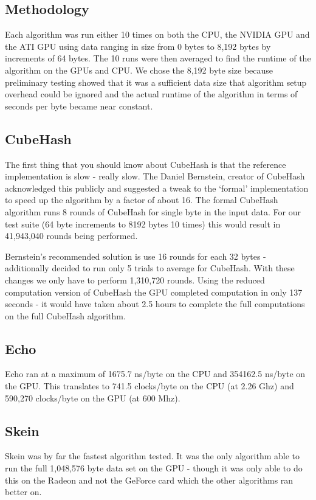 \documentclass{article}
\begin{document}
\subsection*{Methodology}
Each algorithm was run either 10 times on both the CPU, the NVIDIA GPU and the ATI GPU using data ranging in size from 0 bytes to 8,192 bytes by increments of 64 bytes.
The 10 runs were then averaged to find the runtime of the algorithm on the GPUs and CPU.
We chose the 8,192 byte size because preliminary testing showed that it was a sufficient data size that algorithm setup overhead could be ignored and the actual runtime of the algorithm in terms of seconds per byte became near constant.

\subsection*{CubeHash}
The first thing that you should know about CubeHash is that the reference implementation is  slow - really slow.
The Daniel Bernstein, creator of CubeHash acknowledged this publicly\cite{Bernstein} and suggested a tweak to the `formal' implementation to speed up the algorithm by a factor of about 16.
The formal CubeHash algorithm runs 8 rounds of CubeHash for single byte in the input data. For our test suite (64 byte increments to 8192 bytes 10 times) this would result in 41,943,040 rounds being performed.

Bernstein's recommended solution is use 16 rounds for each 32 bytes - additionally decided to run only 5 trials to average for CubeHash.
With these changes we only have to perform 1,310,720 rounds.
Using the reduced computation version of CubeHash the GPU completed computation in only 137 seconds - it would have taken about 2.5 hours to complete the full computations on the full CubeHash algorithm.

\subsection*{Echo}
Echo ran at a maximum of 1675.7 ns/byte on the CPU and 354162.5 ns/byte on the GPU.
This translates to 741.5 clocks/byte on the CPU (at 2.26 Ghz) and 590,270 clocks/byte on the GPU (at 600 Mhz).

\subsection*{Skein}
Skein was by far the fastest algorithm tested.
It was the only algorithm able to run the full 1,048,576 byte data set on the GPU - though it was only able to do this on the Radeon and not the GeForce card which the other algorithms ran better on.
\end{document}
